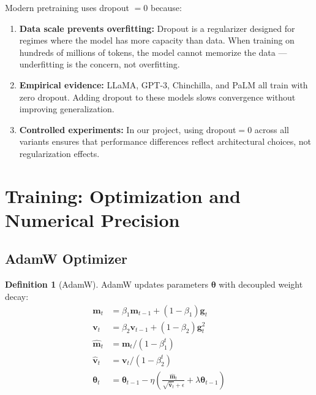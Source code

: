 \documentclass[11pt, a4paper]{article}
\theoremstyle{definition}
\newtheorem{definition}{Definition}[section]
\begin{document}
Modern pretraining uses dropout $= 0$ because:
\begin{enumerate}
    \item \textbf{Data scale prevents overfitting:} Dropout is a regularizer designed for regimes where the model has more capacity than data. When training on hundreds of millions of tokens, the model cannot memorize the data — underfitting is the concern, not overfitting.
    
    \item \textbf{Empirical evidence:} LLaMA, GPT-3, Chinchilla, and PaLM all train with zero dropout. Adding dropout to these models slows convergence without improving generalization.
    
    \item \textbf{Controlled experiments:} In our project, using dropout$=0$ across all variants ensures that performance differences reflect architectural choices, not regularization effects.
\end{enumerate}

\section{Training: Optimization and Numerical Precision}

\subsection{AdamW Optimizer}

\begin{definition}[AdamW]
AdamW updates parameters $\bm{\theta}$ with decoupled weight decay:
\begin{align}
    \bm{m}_t &= \beta_1 \bm{m}_{t-1} + (1 - \beta_1) \bm{g}_t \label{eq:adam_m} \\
    \bm{v}_t &= \beta_2 \bm{v}_{t-1} + (1 - \beta_2) \bm{g}_t^2 \label{eq:adam_v} \\
    \hat{\bm{m}}_t &= \bm{m}_t / (1 - \beta_1^t) \label{eq:adam_mhat} \\
    \hat{\bm{v}}_t &= \bm{v}_t / (1 - \beta_2^t) \label{eq:adam_vhat} \\
    \bm{\theta}_t &= \bm{\theta}_{t-1} - \eta\left(\frac{\hat{\bm{m}}_t}{\sqrt{\hat{\bm{v}}_t} + \epsilon} + \lambda \bm{\theta}_{t-1}\right) \label{eq:adamw_update}
\end{align}
\end{definition}
\end{document}
